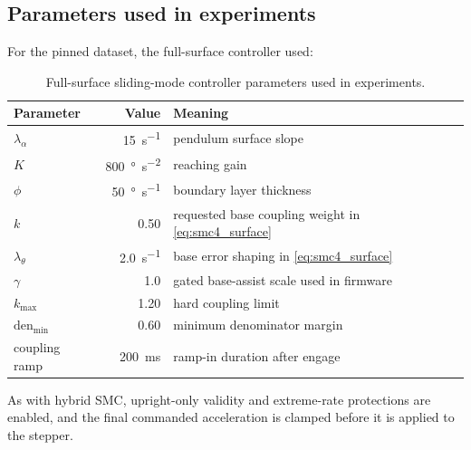 \subsection{Parameters used in experiments}
For the pinned dataset, the full-surface controller used:
\begin{table}[htbp]
  \centering
  \small
  \setlength{\tabcolsep}{5pt}
  \caption{Full-surface sliding-mode controller parameters used in experiments.}
  \label{tab:smc4_params}
  \begin{tabular}{lrl}
    \toprule
    Parameter & Value & Meaning \\
    \midrule
    $\lambda_{\alpha}$ & 15\ \si{s^{-1}} & pendulum surface slope \\
    $K$ & 800\ \si{\degree\per\second\squared} & reaching gain \\
    $\phi$ & 50\ \si{\degree\per\second} & boundary layer thickness \\
    $k$ & 0.50 & requested base coupling weight in \eqref{eq:smc4_surface} \\
    $\lambda_{\theta}$ & 2.0\ \si{s^{-1}} & base error shaping in \eqref{eq:smc4_surface} \\
    $\gamma$ & 1.0 & gated base-assist scale used in firmware \\
    \midrule
    $k_{\max}$ & 1.20 & hard coupling limit \\
    $\mathrm{den}_{\min}$ & 0.60 & minimum denominator margin \\
    coupling ramp & \SI{200}{ms} & ramp-in duration after engage \\
    \bottomrule
  \end{tabular}
\end{table}
As with hybrid SMC, upright-only validity and extreme-rate protections are enabled, and the final commanded acceleration is clamped before it is applied to the stepper.

